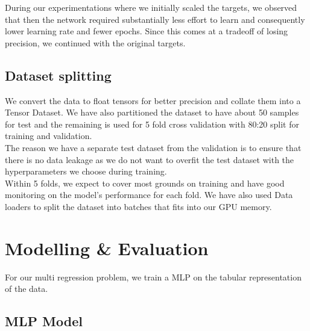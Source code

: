 \documentclass{report} %
\begin{document}
During our experimentations where we initially scaled the targets, we observed that then the network required substantially less effort to learn and consequently lower learning rate and fewer epochs.
Since this comes at a tradeoff of losing precision, we continued with the original targets.\\

\section{Dataset splitting}\label{sec:Dataset splitting}

We convert the data to float tensors for better precision and collate them into a Tensor Dataset.
We have also partitioned the dataset to have about 50 samples for test and the remaining is used for 5 fold cross validation with 80:20 split for training and validation. \\
The reason we have a separate test dataset from the validation is to ensure that there is no data leakage as we do not want to overfit the test dataset with the hyperparameters we choose during training. \\

Within 5 folds, we expect to cover most grounds on training and have good monitoring on the model's performance for each fold.
We have also used Data loaders to split the dataset into batches that fits into our \ac{GPU} memory.

\chapter{Modelling \& Evaluation}

For our multi regression problem, we train a \ac{MLP} on the tabular representation of the data.

\section{\ac{MLP} Model}\label{sec:MLP Model}
\end{document}
